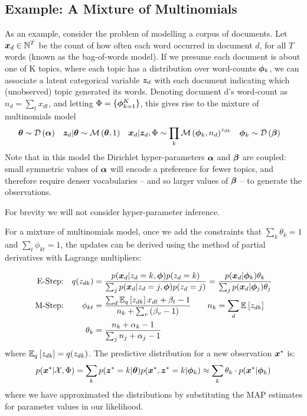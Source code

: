 \subsection*{Example: A Mixture of Multinomials}
\label{sec:ch1:mom}
As an example, consider the problem of modelling a corpus of documents. Let $\xd \in \mathbb{N}^T$ be the count of how often each word occurred in document $d$, for all $T$ words (known as the bag-of-words model). If we presume each document is about one of K topics, where each topic has a distribution over word-counts $\vv{\phi}_k$, we can associate a latent categorical variable $\vv{z}_d$ with each document indicating which (unobserved) topic generated its words. Denoting document d's word-count as $n_d = \sum_t x_{dt}$, and letting $\params = \{ \vv{\phi}_{k=1}^K \}$, this gives rise to the mixture of multinomials model\cite{Nigam2000}
\begin{align}
\vv{\theta} & \sim \dir{\vv{\alpha}} &
\zd|\vv{\theta} & \sim \muln{\vv{\theta}}{1} & 
\xd|\zd, \params & \sim \prod_k \muln{\param_k}{n_d}^{z_{dk}} & 
\param_k & \sim \dir{\vv{\beta}}
\end{align}
Note that in this model the Dirichlet hyper-parameters $\vv{\alpha}$ and $\vv{\beta}$ are coupled: small symmetric values of $\vv{\alpha}$ will encode a preference for fewer topics, and therefore require denser vocabularies -- and so larger values of $\vv{\beta}$ -- to generate the observations. 

For brevity we will not consider hyper-parameter inference. 

For a mixture of multinomials model, once we add the constraints that $\sum_k \theta_k = 1$ and $\sum_t \phi_{kt} = 1$, the updates can be derived using the method of partial derivatives with Lagrange multipliers:


\begin{align}
\text{E-Step:} & & q(z_{dk}) 
& = \frac{p(\xd|z_d = k, \param)p(z_d = k)}{\sum_j p(\xd|z_d = j, \param)p(z_d = j)} 
= \frac{p(\xd | \param_k) \theta_k}{\sum_j p(\xd | \param_j) \theta_j} \label{eqn:mom-estep} \\
\text{M-Step:} 
& & \phi_{kt} & =
    \frac{
        \sum_d \ex{z_{dk}}{q}x_{dt} + \beta_t - 1
    }{
        n_k + \sum_v \left( \beta_v - 1 \right)
    } \qquad n_k = \sum_d \ex{z_{dk}}{} \\
& & \theta_k & =  
    \frac{
        n_k + \alpha_k - 1
    }{
        \sum_j n_j + \alpha_j - 1
    } \label{eqn:mom-mstep}
\end{align}
where $\ex{z_{dk}}{q} = q(z_{dk})$. The predictive distribution for a new observation $\xnew$ is:
\begin{align}
p(\xnew | \xdat, \params)  = \sum_k p(\znew = k | \vv{\theta}) p(\xnew, \znew = k | \param_k) 
\approx \sum_k \theta_k \cdot p(\xnew | \param_k)
\end{align}
where we have approximated the distributions by substituting the MAP estimates for parameter values in our likelihood.

